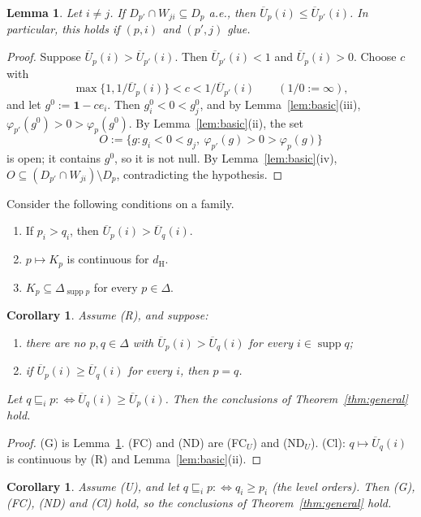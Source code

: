 \documentclass[11pt]{article}
\newtheorem{lemma}[theorem]{Lemma}
\newtheorem{corollary}[theorem]{Corollary}
\theoremstyle{definition}
\newcommand{\one}{\mathbf 1}
\newcommand{\supp}{\operatorname{supp}}
\newcommand{\dH}{d_{\mathrm H}}
\newcommand{\Ub}{\overline U}
\begin{document}
\begin{lemma}\label{lem:bets}
Let $i\ne j$. If $D_{p'}\cap W_{ji}\subseteq D_p$ a.e., then $\Ub_p(i)\le\Ub_{p'}(i)$. In particular, this holds if $(p,i)$ and $(p',j)$ glue.
\end{lemma}

\begin{proof}
Suppose $\Ub_p(i)>\Ub_{p'}(i)$. Then $\Ub_{p'}(i)<1$ and $\Ub_p(i)>0$. Choose $c$ with
\[
\max\{1,1/\Ub_p(i)\}<c<1/\Ub_{p'}(i)\qquad(1/0:=\infty),
\]
and let $g^0:=\one-ce_i$. Then $g^0_i<0<g^0_j$, and by Lemma~\ref{lem:basic}(iii), $\varphi_{p'}(g^0)>0>\varphi_p(g^0)$. By Lemma~\ref{lem:basic}(ii), the set
\[
O:=\{g:g_i<0<g_j,\ \varphi_{p'}(g)>0>\varphi_p(g)\}
\]
is open; it contains $g^0$, so it is not null. By Lemma~\ref{lem:basic}(iv), $O\subseteq(D_{p'}\cap W_{ji})\setminus D_p$, contradicting the hypothesis.
\end{proof}

Consider the following conditions on a family.
\begin{enumerate}[itemsep=2pt]
\item[\textbf{(U)}] If $p_i>q_i$, then $\Ub_p(i)>\Ub_q(i)$.
\item[\textbf{(R)}] $p\mapsto K_p$ is continuous for $\dH$.
\item[\textbf{(F)}] $K_p\subseteq\Delta_{\supp p}$ for every $p\in\Delta$.
\end{enumerate}

\begin{corollary}\label{cor:upper}
Assume (R), and suppose:
\begin{enumerate}[itemsep=0pt]
\item[\textbf{(FC$_U$)}] there are no $p,q\in\Delta$ with $\Ub_p(i)>\Ub_q(i)$ for every $i\in\supp q$;
\item[\textbf{(ND$_U$)}] if $\Ub_p(i)\ge\Ub_q(i)$ for every $i$, then $p=q$.
\end{enumerate}
Let $q\sqsubseteq_ip:\iff\Ub_q(i)\ge\Ub_p(i)$. Then the conclusions of Theorem~\ref{thm:general} hold.
\end{corollary}

\begin{proof}
(G) is Lemma~\ref{lem:bets}. (FC) and (ND) are (FC$_U$) and (ND$_U$). (Cl): $q\mapsto\Ub_q(i)$ is continuous by (R) and Lemma~\ref{lem:basic}(ii).
\end{proof}

\begin{corollary}\label{cor:level}
Assume (U), and let $q\sqsubseteq_ip:\iff q_i\ge p_i$ (the \emph{level orders}). Then (G), (FC), (ND) and (Cl) hold, so the conclusions of Theorem~\ref{thm:general} hold.
\end{corollary}
\end{document}
